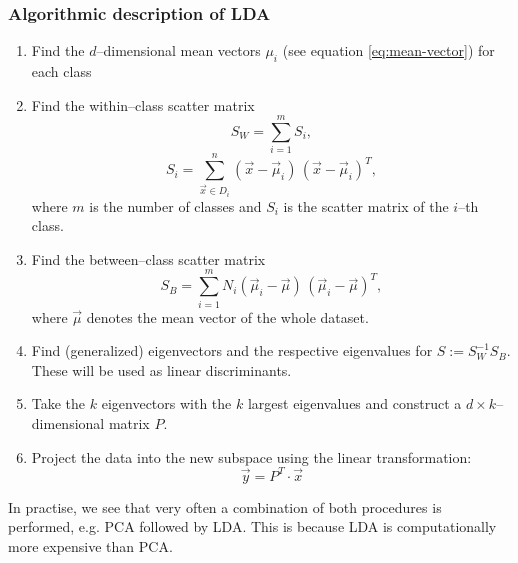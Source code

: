\subsubsection{Algorithmic description of LDA}
\begin{enumerate}
\item Find the $d$--dimensional mean vectors $\mu_i$ (see equation \ref{eq:mean-vector}) for each class
\item Find the within--class scatter matrix
\begin{equation}
S_W = \sum_{i = 1}^m S_i,
\end{equation}
\begin{equation}
S_i = \sum_{\vec x \in D_i}^n (\vec x - \vec \mu_i) \, (\vec x - \vec \mu_i)^T,
\end{equation}
where $m$ is the number of classes and $S_i$ is the scatter matrix of the $i$--th class.
\item Find the between--class scatter matrix
\begin{equation}
S_B = \sum_{i = 1}^m N_i (\vec \mu_i - \vec \mu) \, (\vec \mu_i - \vec \mu)^T,
\end{equation}
where $\vec \mu$ denotes the mean vector of the whole dataset.
\item Find (generalized) eigenvectors and the respective eigenvalues for $S := S_W^{-1} S_B$. These will be used as linear discriminants.
\item Take the $k$ eigenvectors with the $k$ largest eigenvalues and construct a $d \times k$--dimensional matrix $P$.
\item Project the data into the new subspace using the linear transformation:
\begin{equation}
\vec y = P^T \cdot \vec x
\end{equation}
\end{enumerate}

In practise, we see that very often a combination of both procedures is performed, e.g. PCA followed by LDA. This is because LDA is computationally more expensive than PCA.
